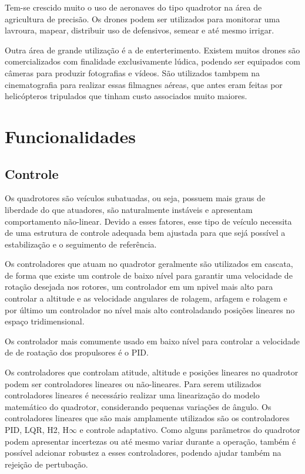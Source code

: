 Tem-se crescido muito o uso de aeronaves do tipo quadrotor na área de agricultura de precisão. Os drones podem ser utilizados para monitorar uma lavroura, mapear, distribuir uso de defensivos, semear e até mesmo irrigar.

Outra área de grande utilização é a de enterterimento. Existem muitos drones são comercializados com finalidade exclusivamente lúdica, podendo ser equipados com câmeras para produzir fotografias e vídeos. São utilizados tambpem na cinematografia para realizar essas filmagnes aéreas, que antes eram feitas por helicópteros tripulados que tinham custo associados muito maiores.


\section{Funcionalidades}
\subsection{Controle}
Os quadrotores são veículos subatuadas, ou seja, possuem mais graus de liberdade do que atuadores, são naturalmente instáveis e apresentam comportamento não-linear. Devido a esses fatores, esse tipo de veículo necessita de uma estrutura de controle adequada bem ajustada para que sejá possível a estabilização e o seguimento de referência.

Os controladores que atuam no quadrotor geralmente são utilizados em cascata, de forma que existe um controle de baixo nível para garantir uma velocidade de rotação desejada nos rotores, um controlador em um npivel mais alto para controlar a altitude e as velocidade angulares de rolagem, arfagem e rolagem e por último um controlador no nível mais alto controladando posições lineares no espaço tridimensional.

Os controlador mais comumente usado em baixo nível para controlar a velocidade de de roatação dos propulsores é o PID. 

Os controladores que controlam atitude, altitude e posições lineares no quadrotor podem ser controladores lineares ou não-lineares. Para serem utilizados controladores lineares é necessário realizar uma linearização do modelo matemático do quadrotor, considerando pequenas variações de ângulo. Os controladores lineares que são mais amplamente utilizados são os controladores PID, LQR, H2, H$\infty$ e controle adaptativo. Como alguns parãmetros do quadrotor podem apresentar incertezas ou até mesmo variar durante a operação, também é possível adcionar robustez a esses controladores, podendo ajudar também na rejeição de pertubação.

